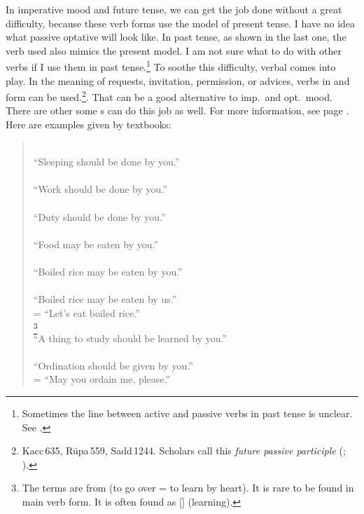 In imperative mood and future tense, we can get the job done without a great difficulty, because these verb forms use the model of present tense. I have no idea what passive optative will look like. In past tense, as shown in the last one, the verb used also mimics the present model. I am not sure what to do with other verbs if I use them in past tense.\footnote{Sometimes the line between active and passive verbs in past tense is unclear. See \citealp[pp.~155-6]{warder:intro}.} To soothe this difficulty, verbal  comes into play. In the meaning of requests, invitation, permission, or advices, verbs in  and  form can be used.\footnote{Kacc\,635, R\=upa\,559, Sadd\,1244. Scholars call this \emph{future passive participle} (\citealp[p.~104]{warder:intro}; \citealp[p.~110]{collins:grammar}).}. That can be a good alternative to imp.\ and opt.\ mood. There are other some s can do this job as well. For more information, see page \pageref{par:passpaccaya}. Here are examples given by textbooks:

\begin{quote}
\\
``Sleeping should be done by you.''\\[1.5mm]
\\
``Work should be done by you.''\\[1.5mm]
\\
``Duty should be done by you.''\\[1.5mm]
\\
``Food may be eaten by you.''\\[1.5mm]
\\
``Boiled rice may be eaten by you.''\\[1.5mm]
\\
``Boiled rice may be eaten by us.''\\
= ``Let's eat boiled rice.''\\[1.5mm]
\footnote{The terms are from  (to go over = to learn by heart). It is rare to be found in main verb form. It is often found as  [] (learning).}\\
``A thing to study should be learned by you.''\\[1.5mm]
\\
``Ordination should be given by you.''\\
= ``May you ordain me, please.''\\[1.5mm]
\end{quote}

